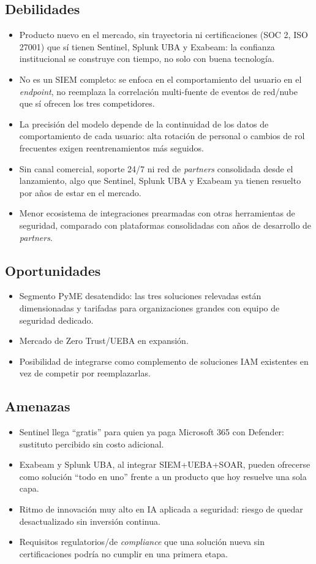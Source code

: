 \subsection{Debilidades}
\begin{itemize}
	\item Producto nuevo en el mercado, sin trayectoria ni certificaciones (SOC 2, ISO 27001) que sí tienen Sentinel, Splunk UBA y Exabeam: la confianza institucional se construye con tiempo, no solo con buena tecnología.
	\item No es un SIEM completo: se enfoca en el comportamiento del usuario en el \emph{endpoint}, no reemplaza la correlación multi-fuente de eventos de red/nube que sí ofrecen los tres competidores.
	\item La precisión del modelo depende de la continuidad de los datos de comportamiento de cada usuario: alta rotación de personal o cambios de rol frecuentes exigen reentrenamientos más seguidos.
	\item Sin canal comercial, soporte 24/7 ni red de \emph{partners} consolidada desde el lanzamiento, algo que Sentinel, Splunk UBA y Exabeam ya tienen resuelto por años de estar en el mercado.
	\item Menor ecosistema de integraciones prearmadas con otras herramientas de seguridad, comparado con plataformas consolidadas con años de desarrollo de \emph{partners}.
\end{itemize}

\subsection{Oportunidades}
\begin{itemize}
	\item Segmento PyME desatendido: las tres soluciones relevadas están dimensionadas y tarifadas para organizaciones grandes con equipo de seguridad dedicado.
	\item Mercado de Zero Trust/UEBA en expansión.
	\item Posibilidad de integrarse como complemento de soluciones IAM existentes en vez de competir por reemplazarlas.
\end{itemize}

\subsection{Amenazas}
\begin{itemize}
	\item Sentinel llega ``gratis'' para quien ya paga Microsoft 365 con Defender: sustituto percibido sin costo adicional.
	\item Exabeam y Splunk UBA, al integrar SIEM+UEBA+SOAR, pueden ofrecerse como solución ``todo en uno'' frente a un producto que hoy resuelve una sola capa.
	\item Ritmo de innovación muy alto en IA aplicada a seguridad: riesgo de quedar desactualizado sin inversión continua.
	\item Requisitos regulatorios/de \emph{compliance} que una solución nueva sin certificaciones podría no cumplir en una primera etapa.
\end{itemize}

